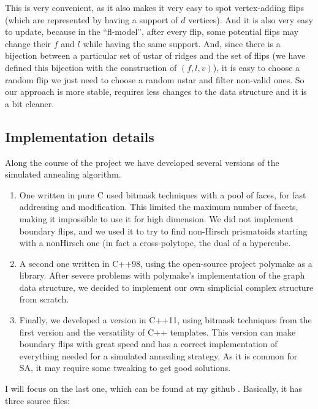 \documentclass[12pt,a4paper]{article}
\theoremstyle{plain}
\theoremstyle{definition}
\begin{document}
This is very convenient, as it also makes it very easy to spot vertex-adding flips (which are represented by having a support of $d$ vertices). And it is also very easy to update, because in the ``fl-model'', after every flip, some potential flips may change their $f$ and $l$ while having the same support. And, since there is a bijection between a particular set of ustar of ridges and the set of flips (we have defined this bijection with the construction of $(f,l,v)$), it is easy to choose a random flip we just need to choose a random ustar and filter non-valid ones. So our approach is more stable, requires less changes to the data structure and it is a bit cleaner.
\subsection{Implementation details}

Along the course of the project we have developed several versions of the simulated annealing algorithm.

\begin{enumerate}
  \item One written in pure C used bitmask techniques with a pool of faces, for fast addressing and modification. This limited the maximum number of facets, making it impossible to use it for high dimension. We did not implement boundary flips, and we used it to try to find non-Hirsch prismatoids starting with a nonHirsch one (in fact a cross-polytope, the dual of a hypercube.
  
  \item A second one written in C++98, using the open-source project polymake \cite{polymake} as a library. After severe problems with polymake's implementation of the graph data structure, we decided to implement our own simplicial complex structure from scratch.

  \item Finally, we developed a version in C++11, using bitmask techniques from the first version and the versatility of C++ templates. This version can make boundary flips with great speed and has a correct implementation of everything needed for a simulated annealing strategy. As it is common for SA, it may require some tweaking to get good solutions.
\end{enumerate}

I will focus on the last one, which can be found at my github \cite{github}. Basically, it has three source files:
\end{document}
